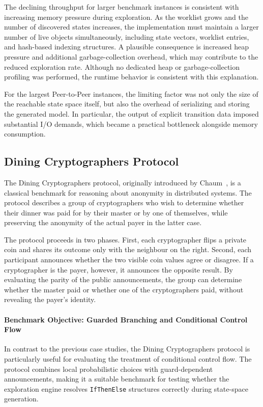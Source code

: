 The declining throughput for larger benchmark instances is consistent with increasing memory pressure during exploration. As the worklist grows and the number of discovered states increases, the implementation must maintain a larger number of live objects simultaneously, including state vectors, worklist entries, and hash-based indexing structures. A plausible consequence is increased heap pressure and additional garbage-collection overhead, which may contribute to the reduced exploration rate. Although no dedicated heap or garbage-collection profiling was performed, the runtime behavior is consistent with this explanation.

For the largest Peer-to-Peer instances, the limiting factor was not only the size of the reachable state space itself, but also the overhead of serializing and storing the generated model. In particular, the output of explicit transition data imposed substantial I/O demands, which became a practical bottleneck alongside memory consumption.
\subsection{Dining Cryptographers Protocol}
\label{sec:dining-cryptographers}

The Dining Cryptographers protocol, originally introduced by Chaum~\cite{Chaum1988}, is a classical benchmark for reasoning about anonymity in distributed systems. The protocol describes a group of cryptographers who wish to determine whether their dinner was paid for by their master or by one of themselves, while preserving the anonymity of the actual payer in the latter case.

The protocol proceeds in two phases. First, each cryptographer flips a private coin and shares its outcome only with the neighbour on the right. Second, each participant announces whether the two visible coin values agree or disagree. If a cryptographer is the payer, however, it announces the opposite result. By evaluating the parity of the public announcements, the group can determine whether the master paid or whether one of the cryptographers paid, without revealing the payer's identity.

\paragraph{Benchmark Objective: Guarded Branching and Conditional Control Flow}
In contrast to the previous case studies, the Dining Cryptographers protocol is particularly useful for evaluating the treatment of conditional control flow. The protocol combines local probabilistic choices with guard-dependent announcements, making it a suitable benchmark for testing whether the exploration engine resolves \texttt{IfThenElse} structures correctly during state-space generation.

